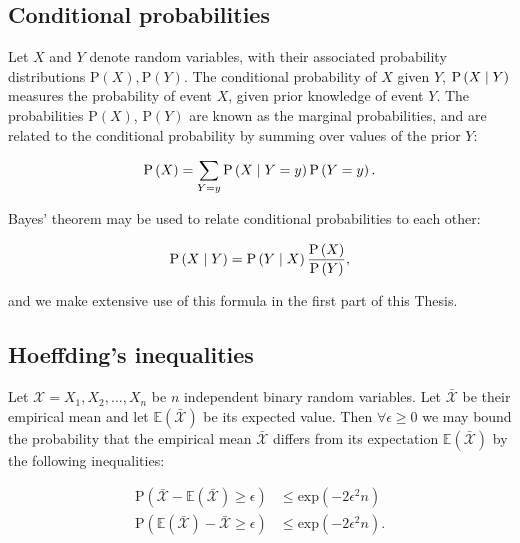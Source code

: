 \FloatBarrier
\subsection{Conditional probabilities}
Let $X$ and $Y$ denote random variables, with their associated probability distributions $\text{P}\left(X\right), \text{P}\left(Y\right)$. The conditional probability of $X$ given $Y$, $\text{P}\left(X \; \middle| \; Y\right)$ measures the probability of event $X$, given prior knowledge of event $Y$. The probabilities $\text{P}\left(X\right)$, $\text{P}\left(Y\right)$ are known as the marginal probabilities, and are related to the conditional probability by summing over values of the prior $Y$:

\begin{equation}
\text{P}\left(X\right) = \sum_{Y=y} \text{P}\left(X \; \middle| \; Y=y\right) \text{P}\left(Y=y\right).
\end{equation}

\noindent Bayes' theorem may be used to relate conditional probabilities to each other:

\begin{equation}\label{eqn:intro_bayes}
\text{P}\left(X \; \middle| \; Y\right) = \text{P}\left(Y \; \middle| \; X\right) \frac{\text{P}\left(X\right)}{\text{P}\left(Y\right)},
\end{equation}

\noindent and we make extensive use of this formula in the first part of this Thesis.

\FloatBarrier
\subsection{Hoeffding's inequalities}
Let $\mathcal{X} = X_1, X_2, \dots, X_n$ be $n$ independent binary random variables. Let $\bar{\mathcal{X}}$ be their empirical mean and let $\mathbb{E}\left(\bar{\mathcal{X}}\right)$ be its expected value. Then $\forall \epsilon \ge 0$ we may bound the probability that the empirical mean $\bar{\mathcal{X}}$ differs from its expectation $\mathbb{E}\left(\bar{\mathcal{X}}\right)$ by the following inequalities:

\begin{align}
\label{eqn:hoeffding1}
\text{P}\left(\bar{\mathcal{X}} - \mathbb{E}\left(\bar{\mathcal{X}}\right) \ge \epsilon\right) &\le \text{exp}\left(- 2 \epsilon^2 n\right) \\
\label{eqn:hoeffding2}
\text{P}\left(\mathbb{E}\left(\bar{\mathcal{X}}\right) - \bar{\mathcal{X}} \ge \epsilon\right) &\le \text{exp}\left(- 2 \epsilon^2 n\right).
\end{align}



